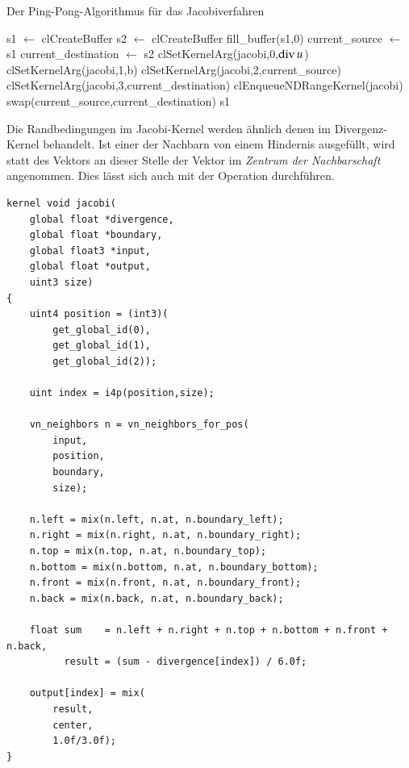 \begin{algorithm}
\caption{Der Ping-Pong-Algorithmus für das Jacobiverfahren}
\label{alg:implementation_wind_ping_ping}
\begin{algorithmic}
	\State s1 $\gets$ clCreateBuffer
	\State s2 $\gets$ clCreateBuffer
        \State fill\_buffer(s1,0)
        \State current\_source $\gets$ s1
        \State current\_destination $\gets$ s2
        \State clSetKernelArg(jacobi,0,$\operatorname*{div} u$)
        \State clSetKernelArg(jacobi,1,b)
            \State clSetKernelArg(jacobi,2,current\_source)
            \State clSetKernelArg(jacobi,3,current\_destination)
            \State clEnqueueNDRangeKernel(jacobi)
            \State swap(current\_source,current\_destination)
        \EndFor
        \State \Return s1
\EndFunction
\end{algorithmic}
\end{algorithm}

Die Randbedingungen im Jacobi-Kernel werden ähnlich denen im
Divergenz-Kernel behandelt. Ist einer der Nachbarn von einem Hindernis
ausgefüllt, wird statt des Vektors an dieser Stelle der Vektor im
\emph{Zentrum der Nachbarschaft} angenommen. Dies lässt sich auch mit
der Operation  durchführen.

\begin{verbatim}
kernel void jacobi(
    global float *divergence,
    global float *boundary,
    global float3 *input,
    global float *output,
    uint3 size)
{
    uint4 position = (int3)(
        get_global_id(0),
        get_global_id(1),
        get_global_id(2));

    uint index = i4p(position,size);

    vn_neighbors n = vn_neighbors_for_pos(
        input,
        position,
        boundary,
        size);

    n.left = mix(n.left, n.at, n.boundary_left);
    n.right = mix(n.right, n.at, n.boundary_right);
    n.top = mix(n.top, n.at, n.boundary_top);
    n.bottom = mix(n.bottom, n.at, n.boundary_bottom);
    n.front = mix(n.front, n.at, n.boundary_front);
    n.back = mix(n.back, n.at, n.boundary_back);

    float sum    = n.left + n.right + n.top + n.bottom + n.front + n.back,
          result = (sum - divergence[index]) / 6.0f;

    output[index] = mix(
        result,
        center,
        1.0f/3.0f);
}

\end{verbatim}

